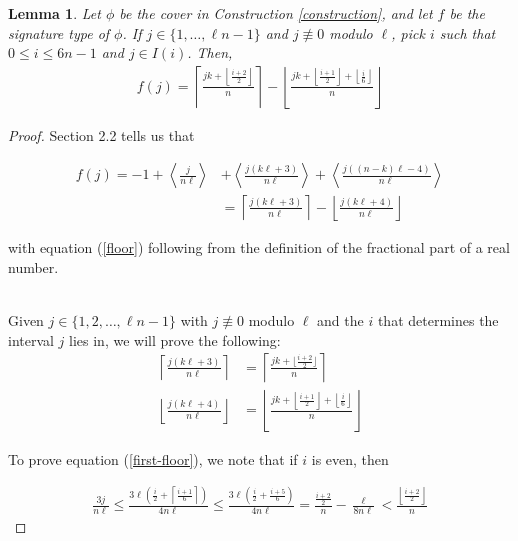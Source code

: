 \documentclass{article}
\newtheorem{lemma}[theorem]{Lemma}
\theoremstyle{remark}
\theoremstyle{definition}
\begin{document}
\begin{lemma}
\label{sigtype}
    Let $\phi$ be the cover in Construction \ref{construction}, and let $f$ be the signature type of $\phi$. If $j \in \{1,\ldots,\ell n-1\}$ and $j \not \equiv 0$ modulo $\ell$, pick $i$ such that $0 \leq i \leq 6n-1$ and $j \in I(i)$. Then,
    \begin{align*}
        f(j) = \left \lceil \frac{jk+\left \lfloor \frac{i+2}{2}\right \rfloor }{n}\right \rceil - \left \lfloor \frac{jk + \left \lfloor \frac{i+1}{2}\right \rfloor + \left \lfloor \frac{i}{6} \right \rfloor }{n} \right \rfloor
    \end{align*}
\end{lemma}
\begin{proof}

Section 2.2 tells us that 

\begin{align}
f(j) = -1 + \left \langle \frac{j}{n\ell}\right \rangle &+ \left \langle \frac{j(k\ell+3)}{n\ell}\right \rangle + \left \langle \frac{j((n-k)\ell-4)}{n\ell}\right \rangle \\ &= \left \lceil \frac{j(k\ell+3)}{n\ell}\right \rceil - \left \lfloor \frac{j(k\ell+4)}{n\ell}\right \rfloor \label{floor}
\end{align}

with equation (\ref{floor}) following from the definition of the fractional part of a real number.
\\\\
\par Given $j \in \{1,2,\ldots,\ell n-1\}$ with $j \not \equiv 0 $ modulo $\ell$ and the $i$ that determines the interval $j$ lies in, we will prove the following: 
\begin{align}
\left \lceil \frac{j(k\ell+3)}{n\ell}\right \rceil &= \left \lceil \frac{jk+ \lfloor \frac{i+2}{2} \rfloor}{n}\right \rceil  \label{first-floor} \\ \left \lfloor \frac{j(k\ell+4)}{n\ell}\right \rfloor &= \left \lfloor \frac{jk + \left \lfloor \frac{i+1}{2}\right \rfloor + \left \lfloor \frac{i}{6} \right \rfloor }{n} \right \rfloor  \label{second-floor}
\end{align}

\par To prove equation (\ref{first-floor}), we note that if $i$ is even, then 

\begin{align*}
    \frac{3j}{n\ell} \leq \frac{3\ell\left (\frac{i}{2} + \left \lceil \frac{i+1}{6} \right \rceil\right)}{4n\ell} \leq \frac{3\ell\left(\frac{i}{2} + \frac{i+5}{6} \right)}{4n\ell} = \frac{\frac{i+2}{2}}{n} - \frac{\ell}{8n\ell} < \frac{\left \lfloor \frac{i+2}{2}\right \rfloor}{n}
\end{align*}


\end{proof}
\end{document}
